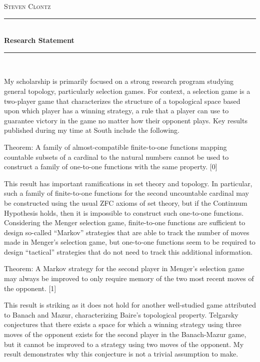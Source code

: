 \documentclass[11pt]{amsart}
\theoremstyle{plain}
\newcommand{\HRule}{\rule{\linewidth}{0.5mm}}
\newcommand{\<}{\langle}
\renewcommand{\>}{\rangle}
\begin{document}
\begin{center}

\textsc{\huge Steven Clontz}

\HRule \\[0.1cm]
{ \huge \bfseries Research Statement \\[0.4cm] }

\HRule \\[1.5cm]

\end{center}


My scholarship is primarily focused on a strong research program studying general topology,
particularly selection games. 
For context, a selection game is a two-player game that
characterizes the structure of a topological space based upon which player has a
winning strategy, a rule that a player can use to guarantee victory in the game
no matter how their opponent plays.
Key results published during my time at South
include the following. 

Theorem: A family of almost-compatible finite-to-one functions
mapping countable subsets of a cardinal
to the natural numbers cannot be used to construct a family of one-to-one
functions with the same property. [0]

This result has important ramifications in set theory and topology. In particular,
such a family of finite-to-one functions for the second uncountable cardinal
may be constructed using the usual ZFC axioms of 
set theory, but if the Continuum Hypothesis holds,
then it is impossible to construct such one-to-one functions. Considering the Menger
selection game, finite-to-one functions
are sufficient to design so-called ``Markov'' strategies that are able to track the number of moves
made in Menger's selection game, but one-to-one functions seem to be required to design
``tactical'' strategies that do not need to track this additional information.

Theorem: A Markov strategy for the second player in Menger's selection game 
may always be improved
to only require memory of the two most recent moves of the opponent. [1] 

This result is striking as it does not hold for another well-studied game
attributed to Banach and Mazur, characterizing Baire's topological property.
Telgarsky conjectures that there exists a space for which a winning
strategy using three moves of the opponent exists for the second player
in the Banach-Mazur game, but it cannot be
improved to a strategy using two moves of the opponent. My result demonstrates
why this conjecture is not a trivial assumption to make. 
\end{document}
